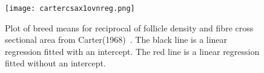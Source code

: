 %

\begin{figure}[h]
  \centering
   \texttt{[image: cartercsax1ovnreg.png]}
  \caption{Plot of breed means for reciprocal of follicle density and fibre cross sectional area from Carter(1968)~\cite{cart:68}. The black line is a linear regression fitted with an intercept. The red line is a linear regression fitted without an intercept.}
  \label{fig:carternxc}
\end{figure}

%


